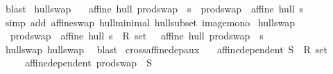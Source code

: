 \begin{isabellebody}
\ blast\isanewline
{}\isamarkupfalse%
%
\endisatagproof
{\isafoldproof}%
%
\isadelimproof
\isanewline
%
\endisadelimproof
\isanewline
{}\isamarkupfalse%
\ hull{\isacharunderscore}{\kern0pt}swap{\isacharunderscore}{\kern0pt}{}{\isacharcolon}{\kern0pt}\ \isanewline
\ \ {\isachardoublequoteopen}affine\ hull\ prod{\isachardot}{\kern0pt}swap\ {\isacharbackquote}{\kern0pt}\ s\ {\isasymsubseteq}\ prod{\isachardot}{\kern0pt}swap\ {\isacharbackquote}{\kern0pt}\ {\isacharparenleft}{\kern0pt}affine\ hull\ s{\isacharparenright}{\kern0pt}{\isachardoublequoteclose}\isanewline
%
\isadelimproof
\ \ %
\endisadelimproof
%
\isatagproof
{}\isamarkupfalse%
\ {\isacharparenleft}{\kern0pt}simp\ add{\isacharcolon}{\kern0pt}\ affine{\isacharunderscore}{\kern0pt}swap\ hull{\isacharunderscore}{\kern0pt}minimal\ hull{\isacharunderscore}{\kern0pt}subset\ image{\isacharunderscore}{\kern0pt}mono{\isacharparenright}{\kern0pt}%
\endisatagproof
{\isafoldproof}%
%
\isadelimproof
\isanewline
%
\endisadelimproof
\isanewline
{}\isamarkupfalse%
\ hull{\isacharunderscore}{\kern0pt}swap{\isacharcolon}{\kern0pt}\ \isanewline
\ \ {\isachardoublequoteopen}prod{\isachardot}{\kern0pt}swap\ {\isacharbackquote}{\kern0pt}\ {\isacharparenleft}{\kern0pt}affine\ hull\ {\isacharparenleft}{\kern0pt}s\ {\isacharcolon}{\kern0pt}{\isacharcolon}{\kern0pt}\ R{}\ set{\isacharparenright}{\kern0pt}{\isacharparenright}{\kern0pt}\ {\isacharequal}{\kern0pt}\ \ affine\ hull\ prod{\isachardot}{\kern0pt}swap\ {\isacharbackquote}{\kern0pt}\ s{\isachardoublequoteclose}\isanewline
%
\isadelimproof
\ \ %
\endisadelimproof
%
\isatagproof
{}\isamarkupfalse%
\ hull{\isacharunderscore}{\kern0pt}swap{\isacharunderscore}{\kern0pt}{}\ hull{\isacharunderscore}{\kern0pt}swap{\isacharunderscore}{\kern0pt}{}\ \isamarkupfalse%
\ blast%
\endisatagproof
{\isafoldproof}%
%
\isadelimproof
\isanewline
%
\endisadelimproof
\isanewline
{}\isamarkupfalse%
\ cross{\isacharunderscore}{\kern0pt}affine{\isacharunderscore}{\kern0pt}dep{\isacharunderscore}{\kern0pt}aux{}{\isacharcolon}{\kern0pt}\isanewline
\ \ \ {\isachardoublequoteopen}affine{\isacharunderscore}{\kern0pt}dependent\ {\isacharparenleft}{\kern0pt}S\ {\isacharcolon}{\kern0pt}{\isacharcolon}{\kern0pt}\ R{}\ set{\isacharparenright}{\kern0pt}{\isachardoublequoteclose}\isanewline
\ \ \ \ \ {\isachardoublequoteopen}affine{\isacharunderscore}{\kern0pt}dependent\ {\isacharparenleft}{\kern0pt}prod{\isachardot}{\kern0pt}swap\ {\isacharbackquote}{\kern0pt}\ S{\isacharparenright}{\kern0pt}{\isachardoublequoteclose}\isanewline

\end{isabellebody}
